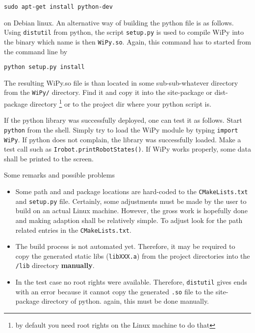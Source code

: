 \documentclass[11pt,a4paper,onepage,openany]{book}
\begin{document}
\begin{verbatim}
sudo apt-get install python-dev
\end{verbatim}

on Debian linux. An alternative way of building the python file is as follows.
Using \texttt{distutil}
from python, the script \texttt{setup.py} is used to compile WiPy into the
binary which name is then \texttt{WiPy.so}. Again, this command has to started
from the command line by

\begin{verbatim}
python setup.py install
\end{verbatim}

The resulting WiPy.so file is than located in some sub-sub-whatever directory
from the \texttt{WiPy/} directory. Find it and copy it into the site-package or dist-package
directory \footnote{by default you need root rights on the Linux machine to do that} or to the
project dir where your python script is.

If the python library was successfully deployed, one can test it as follows.
Start \texttt{python} from the shell. Simply try to load the WiPy module by
typing \texttt{import WiPy}. If python does not complain, the library was
successfully loaded. Make a test call such as \texttt{Irobot.printRobotStates()}.
If WiPy works properly, some data shall be printed to the screen.

Some remarks and possible problems
\begin{itemize}
\item Some path and and package locations are hard-coded to the
    \texttt{CMakeLists.txt} and \texttt{setup.py} file. Certainly, some
    adjustments must be made by the user to build on an actual Linux machine.
    However, the gross work is hopefully done and making adaption shall be
    relatively simple. To adjust look for the path related entries in the
    \texttt{CMakeLists.txt}.

\item The build process is not automated yet. Therefore, it may be required to copy
    the generated static libs (\texttt{libXXX.a}) from the project directories
    into the \texttt{/lib} directory \textbf{manually}.

\item In the test case no root rights were available. Therefore,
    \texttt{distutil} gives ends with an error because it cannot copy the
    generated \texttt{.so} file to the site-package directory of python. again,
    this must be done manually.
\end{itemize}
\end{document}
